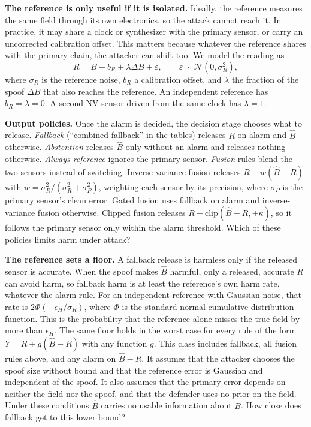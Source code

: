 \documentclass[conference,9pt]{IEEEtran}
\newcommand{\Bhat}{\widehat{B}}
\begin{document}
\textbf{The reference is only useful if it is isolated.} Ideally, the reference measures the same
field through its own electronics, so the attack cannot reach it. In practice, it may share a clock
or synthesizer with the primary sensor, or carry an uncorrected calibration offset. This matters
because whatever the reference shares with the primary chain, the attacker can shift too. We model
the reading as
\begin{equation}
 R=B+b_R+\lambda\Delta B+\varepsilon,\qquad \varepsilon\sim\mathcal N(0,\sigma_R^2),
 \label{eq:reference}
\end{equation}
where $\sigma_R$ is the reference noise, $b_R$ a calibration offset, and $\lambda$ the fraction of
the spoof $\Delta B$ that also reaches the reference. An independent reference has $b_R=\lambda=0$.
A second NV sensor driven from the same clock has $\lambda=1$.

\textbf{Output policies.} Once the alarm is decided, the decision stage chooses what to release.
\emph{Fallback} (``combined fallback'' in the tables) releases $R$ on alarm and $\Bhat$ otherwise. \emph{Abstention} releases $\Bhat$
only without an alarm and releases nothing otherwise. \emph{Always-reference} ignores the primary
sensor. \emph{Fusion} rules blend the two sensors instead of switching. Inverse-variance fusion
releases $R+w(\Bhat-R)$ with $w=\sigma_R^2/(\sigma_R^2+\sigma_P^2)$, weighting each sensor by its
precision, where $\sigma_P$ is the primary sensor's clean error. Gated fusion uses fallback on alarm
and inverse-variance fusion otherwise. Clipped fusion releases $R+\mathrm{clip}(\Bhat-R,\pm\kappa)$,
so it follows the primary sensor only within the alarm threshold. Which of these policies limits
harm under attack?

\textbf{The reference sets a floor.} A fallback release is harmless only if the released sensor is
accurate. When the spoof makes $\Bhat$ harmful, only a released, accurate $R$ can avoid harm, so
fallback harm is at least the reference's own harm rate, whatever the alarm rule. For an
independent reference with Gaussian noise, that rate is $2\Phi(-\epsilon_H/\sigma_R)$, where
$\Phi$ is the standard normal cumulative distribution function. This is the probability that the
reference alone misses the true field by more than $\epsilon_H$. The same floor holds in the worst case for every rule of the form $Y=R+g(\Bhat-R)$ with any
function $g$. This class includes fallback, all fusion rules above, and any alarm on $\Bhat-R$. It assumes that the attacker chooses the spoof size without bound and that the reference error is
Gaussian and independent of the spoof. It also assumes that the primary error depends on neither
the field nor the spoof, and that the defender uses no prior on the field. Under these conditions $\Bhat$
carries no usable information about $B$.  How close does fallback get to this lower bound?
\end{document}
